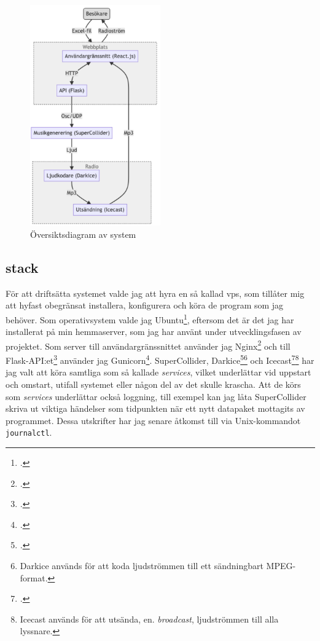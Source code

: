 \documentclass[11pt, a4paper]{article} %
\begin{document}
\begin{figure}[H]
\centering
\includegraphics[width=0.5\textwidth]{../media/flowchart.png}
\caption{Översiktsdiagram av system}
\label{system}
\end{figure}

\subsection*{\gls{stack}}
För att driftsätta systemet valde jag att hyra en så kallad \gls{vps}, som tillåter mig att hyfast obegränsat installera, konfigurera och köra de program som jag behöver. Som operativsystem valde jag Ubuntu\footcite[version 20.04]{noauthor_enterprise_nodate}, eftersom det är det jag har installerat på min hemmaserver, som jag har använt under utvecklingsfasen av projektet. Som server till användargränssnittet använder jag Nginx\footcite{noauthor_nginx_nodate} och till Flask-API:et\footcite{noauthor_welcome_nodate} använder jag Gunicorn\footcite{noauthor_gunicorn_nodate}. SuperCollider, Darkice\footcite{noauthor_darkice_nodate}\footnote{Darkice används för att koda ljudströmmen till ett sändningbart MPEG-format.} och Icecast\footcite{noauthor_icecast_nodate}\footnote{Icecast används för att utsända, en. \emph{broadcast}, ljudströmmen till alla lyssnare.} har jag valt att köra samtliga som så kallade \emph{services}, vilket underlättar vid uppstart och omstart, utifall systemet eller någon del av det skulle krascha. Att de körs som \emph{services} underlättar också loggning, till exempel kan jag låta SuperCollider skriva ut viktiga händelser som tidpunkten när ett nytt datapaket mottagits av programmet. Dessa utskrifter har jag senare åtkomst till via Unix-kommandot \texttt{journalctl}.
\end{document}
